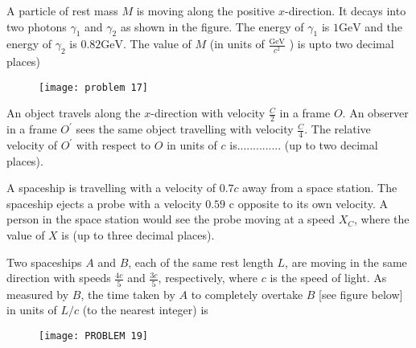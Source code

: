 \begin{enumerate}
\begin{minipage}{\textwidth}
	\item A particle of rest mass $M$ is moving along the positive $x$-direction. It decays into two photons $\gamma_{1}$ and $\gamma_{2}$ as shown in the figure. The energy of $\gamma_{1}$ is $1 \mathrm{GeV}$ and the energy of $\gamma_{2}$ is $0.82 \mathrm{GeV}$. The value of $M$ (in units of $\frac{\mathrm{GeV}}{c^{2}}$ ) is upto two decimal places)
	\begin{figure}[H]
		\centering
		\texttt{[image: problem 17]}
	\end{figure}
\end{minipage}
\begin{minipage}{\textwidth}
	\item An object travels along the $x$-direction with velocity $\frac{C}{2}$ in a frame $O$. An observer in a frame $O^{\prime}$ sees the same object travelling with velocity $\frac{C}{4}$. The relative velocity of $O^{\prime}$ with respect to $O$ in units of $c$ is.............. (up to two decimal places).
\end{minipage}
\begin{minipage}{\textwidth}
	\item A spaceship is travelling with a velocity of $0.7 c$ away from a space station. The spaceship ejects a probe with a velocity $0.59$ c opposite to its own velocity. A person in the space station would see the probe moving at a speed $X_{C}$, where the value of $X$ is (up to three decimal places).
\end{minipage}
\begin{minipage}{\textwidth}
	\item Two spaceships $A$ and $B$, each of the same rest length $L$, are moving in the same direction with speeds $\frac{4 c}{5}$ and $\frac{3 c}{5}$, respectively, where $c$ is the speed of light. As measured by $B$, the time taken by $A$ to completely overtake $B$ [see figure below] in units of $L / c$ (to the nearest integer) is
	$\left. \right. $\\
	\begin{minipage}{0.5\textwidth}
		\begin{figure}[H]
			\centering
			\texttt{[image: PROBLEM 19]}
		\end{figure}	
	\end{minipage}
	\begin{minipage}{0.5\textwidth}

\end{minipage}
\end{minipage}
\end{enumerate}
